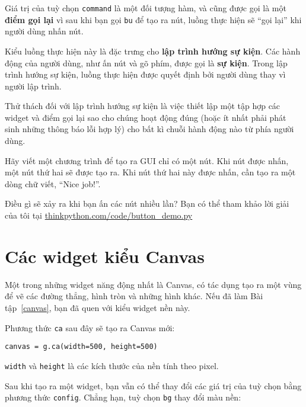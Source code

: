 \documentclass[11pt]{book}
\begin{document}

Giá trị của tuỳ chọn {\tt command} là một
đối tượng hàm, và cũng được gọi là một {\bf điểm gọi lại} vì sau khi 
bạn gọi {\tt bu} để tạo ra nút, luồng thực hiện sẽ
``gọi lại'' khi người dùng nhấn nút.


Kiểu luồng thực hiện này là đặc trưng cho {\bf lập trình hướng sự kiện}.
Các hành động của người dùng, như ấn nút và gõ phím, được gọi là {\bf
sự kiện}. Trong lập trình hướng sự kiện, luồng thực hiện được
quyết định bởi người dùng thay vì người lập trình.

Thử thách đối với lập trình hướng sự kiện là việc thiết lập một tập hợp
các widget và điểm gọi lại sao cho chúng hoạt động đúng (hoặc ít nhất
phải phát sinh những thông báo lỗi hợp lý) cho bất kì chuỗi hành động
nào từ phía người dùng.

\begin{ex}

Hãy viết một chương trình để tạo ra GUI chỉ có một nút.  Khi nút được nhấn,
một nút thứ hai sẽ được tạo ra. Khi nút thứ hai này được nhấn, cần tạo ra
một dòng chữ viết, ``Nice job!''.

Điều gì sẽ xảy ra khi bạn ấn các nút nhiều lần?
Bạn có thể tham khảo lời giải của tôi tại \url{thinkpython.com/code/button_demo.py}

\end{ex}


\section{Các widget kiểu Canvas}


Một trong những widget năng động nhất là Canvas, có tác dụng tạo ra
một vùng để vẽ các đường thẳng, hình tròn và những hình khác. Nếu
đã làm Bài tập~\ref{canvas}, bạn đã quen với kiểu widget nền này.

Phương thức {\tt ca} sau đây sẽ tạo ra Canvas mới:

\beforeverb
\begin{verbatim}
canvas = g.ca(width=500, height=500)
\end{verbatim}
\afterverb
%
{\tt width} và {\tt height} là các kích thước của nền tính theo
pixel.


Sau khi tạo ra một widget, bạn vẫn có thể thay đổi các giá trị
của tuỳ chọn bằng phương thức {\tt config}. Chẳng hạn, 
tuỳ chọn {\tt bg} thay đổi màu nền:
\end{document}
